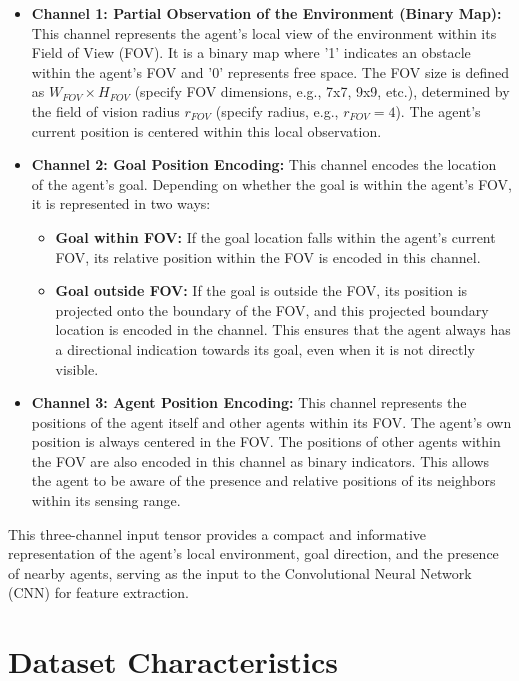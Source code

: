 \begin{itemize}
    \item \textbf{Channel 1: Partial Observation of the Environment (Binary Map):} This channel represents the agent's local view of the environment within its Field of View (FOV). It is a binary map where '1' indicates an obstacle within the agent's FOV and '0' represents free space. The FOV size is defined as $W_{FOV} \times H_{FOV}$ (specify FOV dimensions, e.g., 7x7, 9x9, etc.), determined by the field of vision radius $r_{FOV}$ (specify radius, e.g., $r_{FOV}=4$). The agent's current position is centered within this local observation.
    \item \textbf{Channel 2: Goal Position Encoding:} This channel encodes the location of the agent's goal. Depending on whether the goal is within the agent's FOV, it is represented in two ways:
        \begin{itemize}
            \item \textbf{Goal within FOV:} If the goal location falls within the agent's current FOV, its relative position within the FOV is encoded in this channel.
            \item \textbf{Goal outside FOV:} If the goal is outside the FOV, its position is projected onto the boundary of the FOV, and this projected boundary location is encoded in the channel. This ensures that the agent always has a directional indication towards its goal, even when it is not directly visible.
        \end{itemize}
    \item \textbf{Channel 3: Agent Position Encoding:} This channel represents the positions of the agent itself and other agents within its FOV. The agent's own position is always centered in the FOV. The positions of other agents within the FOV are also encoded in this channel as binary indicators. This allows the agent to be aware of the presence and relative positions of its neighbors within its sensing range.
\end{itemize}

This three-channel input tensor provides a compact and informative representation of the agent's local environment, goal direction, and the presence of nearby agents, serving as the input to the Convolutional Neural Network (CNN) for feature extraction.

\section{Dataset Characteristics}

